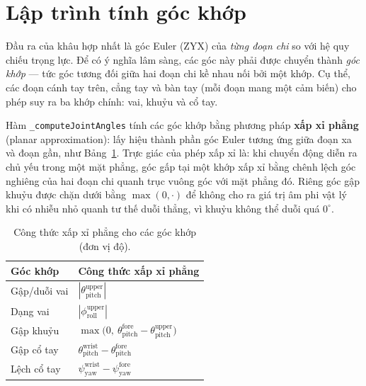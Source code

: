 \documentclass[../DoAn.tex]{subfiles}
\begin{document}
\section{Lập trình tính góc khớp}
\label{sec:impl_joint}

Đầu ra của khâu hợp nhất là góc Euler (ZYX) của \emph{từng đoạn chi} so với hệ quy chiếu trọng lực. Để có ý nghĩa lâm sàng, các góc này phải được chuyển thành \emph{góc khớp} --- tức góc tương đối giữa hai đoạn chi kề nhau nối bởi một khớp. Cụ thể, các đoạn cánh tay trên, cẳng tay và bàn tay (mỗi đoạn mang một cảm biến) cho phép suy ra ba khớp chính: vai, khuỷu và cổ tay.

Hàm \texttt{\_computeJointAngles} tính các góc khớp bằng phương pháp \textbf{xấp xỉ phẳng} (planar approximation): lấy hiệu thành phần góc Euler tương ứng giữa đoạn xa và đoạn gần, như Bảng~\ref{tab:jointformula}. Trực giác của phép xấp xỉ là: khi chuyển động diễn ra chủ yếu trong một mặt phẳng, góc gấp tại một khớp xấp xỉ bằng chênh lệch góc nghiêng của hai đoạn chi quanh trục vuông góc với mặt phẳng đó. Riêng góc gập khuỷu được chặn dưới bằng $\max(0,\cdot)$ để không cho ra giá trị âm phi vật lý khi có nhiễu nhỏ quanh tư thế duỗi thẳng, vì khuỷu không thể duỗi quá $0^{\circ}$.

\begin{table}[H]
    \centering
    \caption{Công thức xấp xỉ phẳng cho các góc khớp (đơn vị độ).}
    \label{tab:jointformula}
    \begin{tabular}{p{6cm} p{6.5cm}}
        \toprule
        \textbf{Góc khớp} & \textbf{Công thức xấp xỉ phẳng}                                                                          \\
        \midrule
        Gập/duỗi vai      & $|\theta^{\mathrm{upper}}_{\mathrm{pitch}}|$                                                             \\
        Dạng vai          & $|\phi^{\mathrm{upper}}_{\mathrm{roll}}|$                                                                \\
        Gập khuỷu         & $\max\!\big(0,\ \theta^{\mathrm{fore}}_{\mathrm{pitch}} - \theta^{\mathrm{upper}}_{\mathrm{pitch}}\big)$ \\
        Gập cổ tay        & $\theta^{\mathrm{wrist}}_{\mathrm{pitch}} - \theta^{\mathrm{fore}}_{\mathrm{pitch}}$                     \\
        Lệch cổ tay       & $\psi^{\mathrm{wrist}}_{\mathrm{yaw}} - \psi^{\mathrm{fore}}_{\mathrm{yaw}}$                             \\
        \bottomrule
    \end{tabular}
\end{table}
\end{document}
